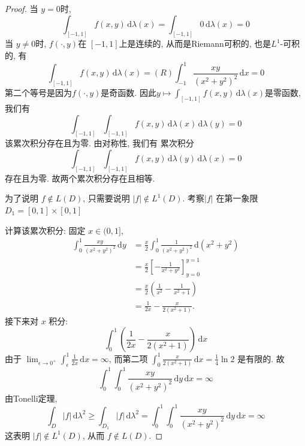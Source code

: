 \documentclass[../main.tex]{subfiles}
\begin{document}
\begin{proof}
     当 \(  y= 0  \)时,  \[
     \int_{[-1,1]}f\left( x,y \right)\,\mathrm{d}  \lambda \left( x \right)= \int_{[-1,1]}0\,\mathrm{d}  \lambda \left( x \right)= 0   
     \] 当 \(  y\neq 0  \)时,  \(  f\left( \cdot ,y \right)   \)在 \(  \left[ -1,1 \right]   \)上是连续的, 从而是Riemann可积的, 也是\(  L^{1}  \)-可积的, 有 \[
     \int_{[-1,1]}f\left( x,y \right)\,\mathrm{d}  \lambda \left( x \right)= \left( R \right)\int_{-1}^{1}\frac{xy }{\left( x^{2}+ y^{2} \right)^{2}  }\,\mathrm{d} x    = 0
     \]    第二个等号是因为\(  f\left( \cdot ,y \right)   \)是奇函数. 因此\(y\mapsto \int_{[-1,1]}f\left( x,y \right)\,\mathrm{d}  \lambda \left( x \right)    \)是零函数, 我们有 \[
     \int_{ [-1,1]}\int_{[-1,1]}f\left( x,y \right)\,\mathrm{d}  \lambda \left( x \right)\,\mathrm{d}  \lambda \left( y \right)= 0   
     \]  该累次积分存在且为零. 由对称性, 我们有 累次积分 \[
     \int_{[-1,1]}\int_{[-1,1]}f\left( x,y \right)\,\mathrm{d}  \lambda \left( y \right)\,\mathrm{d}  \lambda \left( x \right)= 0   
     \]存在且为零. 故两个累次积分存在且相等.
     
为了说明 \( f \notin L(D) \), 只需要说明 \( |f| \notin L^1(D) \).
 考察\(  \left| f \right|   \) 在第一象限 \( D_{1} = [0,1]\times[0,1] \) 

计算该累次积分:
固定 \( x \in (0, 1] \),
\[
\begin{aligned}
\int_{0}^{1} \frac{xy}{(x^2+y^2)^2} \,\mathrm{d}y &= \frac{x}{2} \int_{0}^{1} \frac{1}{(x^2+y^2)^2} \,\mathrm{d}(x^2+y^2) \\
&= \frac{x}{2} \left[ -\frac{1}{x^2+y^2} \right]_{y=0}^{y=1} \\
&= \frac{x}{2} \left( \frac{1}{x^2} - \frac{1}{x^2+1} \right) \\
&= \frac{1}{2x} - \frac{x}{2(x^2+1)}.
\end{aligned}
\]接下来对 \( x \) 积分:
\[
\int_{0}^{1} \left( \frac{1}{2x} - \frac{x}{2(x^2+1)} \right) \,\mathrm{d}x
\]
由于 \( \lim_{\epsilon \to 0^+} \int_{\epsilon}^{1} \frac{1}{2x} \,\mathrm{d}x = \infty \), 而第二项 \( \int_{0}^{1} \frac{x}{2(x^2+1)} \,\mathrm{d}x = \frac{1}{4}\ln 2 \) 是有限的.
故
\[
\int_{0}^{1}\int_{0}^{1}\frac{xy }{\left( x^{2}+ y^{2} \right)^{2}  }\,\mathrm{d} y\,\mathrm{d} x= \infty 
\]由Tonelli定理,  \[
\int_{D}\left| f \right|\,\mathrm{d}  \lambda ^{2}\ge  \int_{D_1}\left| f \right|\,\mathrm{d}  \lambda ^{2}=\int_{0}^{1}\int_{0}^{1}\frac{xy }{\left( x^{2}+ y^{2} \right)^{2}  }\,\mathrm{d} y\,\mathrm{d} x= \infty 
\]
这表明 \( |f| \notin L^1(D) \), 从而 \( f \notin L(D) \). 
\end{proof}
\end{document}
